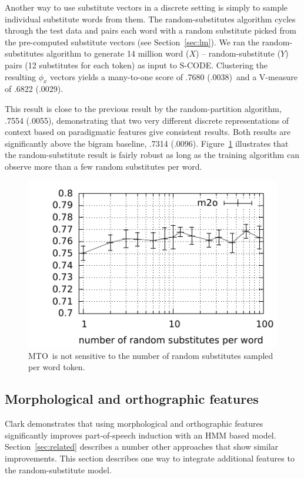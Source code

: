 \documentclass[11pt]{article}
\newcommand{\mto}{\mbox{MTO }}
\newcommand{\bgmto}{.7314 (.0096)}
\newcommand{\rpmto}{.7554 (.0055)}
\newcommand{\wsmto}{.7680 (.0038)}
\newcommand{\wsvm}{.6822 (.0029)}
\begin{document}
Another way to use substitute vectors in a discrete setting is simply
to sample individual substitute words from them.  The
random-substitutes algorithm cycles through the test data and pairs
each word with a random substitute picked from the pre-computed
substitute vectors (see Section~\ref{sec:lm}).  We ran the
random-substitutes algorithm to generate 14 million word ($X$) --
random-substitute ($Y$) pairs (12 substitutes for each token) as input
to S-CODE.  Clustering the resulting $\phi_x$ vectors yields a
many-to-one score of \wsmto\ and a V-measure of \wsvm.

This result is close to the previous result by the random-partition
algorithm, \rpmto, demonstrating that two very different discrete
representations of context based on paradigmatic features give
consistent results.  Both results are significantly above the bigram
baseline, \bgmto.  Figure~\ref{plot-s} illustrates that the
random-substitute result is fairly robust as long as the training
algorithm can observe more than a few random substitutes per word.

\begin{figure}[ht] \centering
\includegraphics[width=\linewidth]{plot-s.pdf}
\caption{\mto is not sensitive to the number of random substitutes
  sampled per word token.}
\label{plot-s}
\end{figure}

\subsection{Morphological and orthographic features}\label{sec:feat}

Clark  demonstrates that
using morphological and orthographic features significantly improves
part-of-speech induction with an HMM based model.
Section~\ref{sec:related} describes a number other approaches that
show similar improvements.  This section describes one way to
integrate additional features to the random-substitute model.
\end{document}
